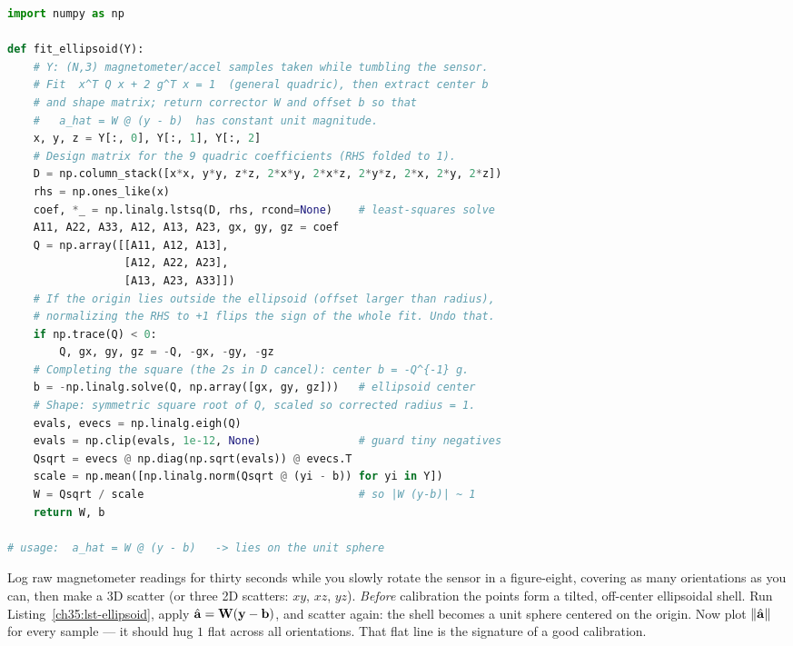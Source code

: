 \begin{lstlisting}[language=Python, caption={Hard/soft-iron-aware ellipsoid fit (least squares), then correction.\label{ch35:lst-ellipsoid}}]
import numpy as np

def fit_ellipsoid(Y):
    # Y: (N,3) magnetometer/accel samples taken while tumbling the sensor.
    # Fit  x^T Q x + 2 g^T x = 1  (general quadric), then extract center b
    # and shape matrix; return corrector W and offset b so that
    #   a_hat = W @ (y - b)  has constant unit magnitude.
    x, y, z = Y[:, 0], Y[:, 1], Y[:, 2]
    # Design matrix for the 9 quadric coefficients (RHS folded to 1).
    D = np.column_stack([x*x, y*y, z*z, 2*x*y, 2*x*z, 2*y*z, 2*x, 2*y, 2*z])
    rhs = np.ones_like(x)
    coef, *_ = np.linalg.lstsq(D, rhs, rcond=None)    # least-squares solve
    A11, A22, A33, A12, A13, A23, gx, gy, gz = coef
    Q = np.array([[A11, A12, A13],
                  [A12, A22, A23],
                  [A13, A23, A33]])
    # If the origin lies outside the ellipsoid (offset larger than radius),
    # normalizing the RHS to +1 flips the sign of the whole fit. Undo that.
    if np.trace(Q) < 0:
        Q, gx, gy, gz = -Q, -gx, -gy, -gz
    # Completing the square (the 2s in D cancel): center b = -Q^{-1} g.
    b = -np.linalg.solve(Q, np.array([gx, gy, gz]))   # ellipsoid center
    # Shape: symmetric square root of Q, scaled so corrected radius = 1.
    evals, evecs = np.linalg.eigh(Q)
    evals = np.clip(evals, 1e-12, None)               # guard tiny negatives
    Qsqrt = evecs @ np.diag(np.sqrt(evals)) @ evecs.T
    scale = np.mean([np.linalg.norm(Qsqrt @ (yi - b)) for yi in Y])
    W = Qsqrt / scale                                 # so |W (y-b)| ~ 1
    return W, b

# usage:  a_hat = W @ (y - b)   -> lies on the unit sphere
\end{lstlisting}

\begin{labbox}
Log raw magnetometer readings for thirty seconds while you slowly rotate the
sensor in a figure-eight, covering as many orientations as you can, then make a
3D scatter (or three 2D scatters: $xy$, $xz$, $yz$). \emph{Before} calibration
the points form a tilted, off-center ellipsoidal shell. Run
Listing~\ref{ch35:lst-ellipsoid}, apply $\hat{\mathbf{a}} = \mathbf{W}(\mathbf{y}-\mathbf{b})$,
and scatter again: the shell becomes a unit sphere centered on the origin. Now
plot $\lVert\hat{\mathbf{a}}\rVert$ for every sample --- it should hug $1$ flat across all
orientations. That flat line is the signature of a good calibration.
\end{labbox}

